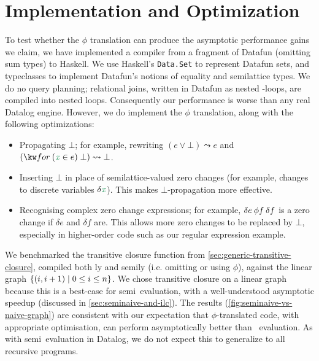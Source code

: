\section{Implementation and Optimization}
\label{sec:implementation}

\newcommand\rewrites\leadsto

To test whether the $\phi$ translation can produce the asymptotic performance
gains we claim, we have implemented a compiler from a fragment of Datafun
(omitting sum types) to Haskell.
%
We use Haskell's \texttt{Data.Set} to represent Datafun sets, and
typeclasses to implement Datafun's notions of equality and semilattice types.
%
We do no query planning; relational joins, written in Datafun as nested
-loops, are compiled into nested loops.
%
Consequently our performance is worse than any real Datalog engine.
%
However, we do implement the $\phi$ translation, along with the following
optimizations:

\begin{itemize}
\item Propagating $\bot$; for example, rewriting $(e \vee \bot) \rewrites e$ and
  $(\efor{x}{e} \bot) \rewrites \bot$.

\item Inserting $\bot$ in place of semilattice-valued zero changes (for example,
  changes to discrete variables $\delta \dvar x$). This makes $\bot$-propagation
  more effective.

\item Recognising complex zero change expressions; for example, $\delta e \<\phi
  f \<\delta f$ is a zero change if $\delta e$ and $\delta f$ are. This allows
  more zero changes to be replaced by $\bot$, especially in higher-order code
  such as our regular expression example.
\end{itemize}



We benchmarked the transitive closure function  from
\cref{sec:generic-transitive-closure}, compiled both \naive{}ly and
semi\naive{}ly (i.e. omitting or using $\phi$), against the linear graph
$\{(i,i+1) \mathrel{|} 0 \le i \le n\}$. We chose transitive closure on a linear graph
because this is a best-case for semi\naive\ evaluation, with a well-understood
asymptotic speedup (discussed in \cref{sec:seminaive-and-ilc}). The results
(\cref{fig:seminaive-vs-naive-graph}) are consistent with our expectation that
$\phi$-translated code, with appropriate optimisation, can perform
asymptotically better than \naive\ evaluation. As with semi\naive\ evaluation in
Datalog, we do not expect this to generalize to all recursive programs.

